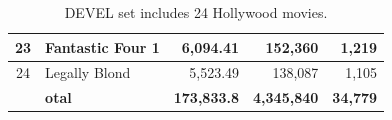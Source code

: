 \documentclass[review]{elsarticle}
\begin{document}
\begin{table}[!t]
\begin{tabular}{|c|l|r|r|r|}
		23 & Fantastic Four 1 & 6,094.41 & 152,360 & 1,219 \\ \hline
		24 & Legally Blond & 5,523.49 & 138,087 & 1,105 \\ \hline
	    & \textbf{otal} & \textbf{173,833.8} & \textbf{4,345,840} & \textbf{34,779} \\ \hline
	\end{tabular}
	\caption{DEVEL set includes 24 Hollywood movies.}
	\label{devel-dataset}
\end{table}


\end{document}
